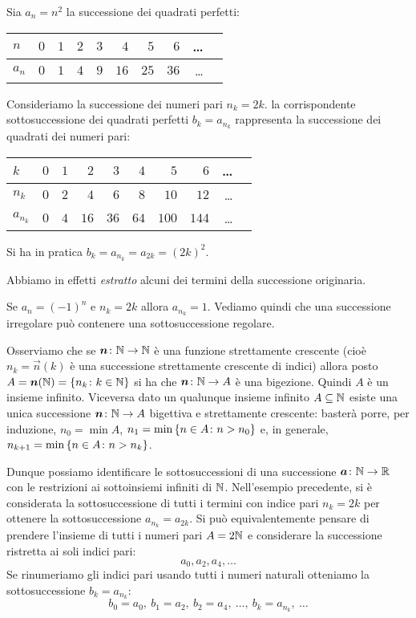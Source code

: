 \begin{example}
Sia $a_n = n^2$ la successione dei quadrati perfetti:
\begin{center}
\begin{tabular}{l|rrrrrrrrr}
$n$   & $0$ & $1$ & $2$ & $3$ & $4$  & $5$  & $6$  & \dots \\ \hline
$a_n$ & $0$ & $1$ & $4$ & $9$ & $16$ & $25$ & $36$ & \dots
\end{tabular}
\end{center}
Consideriamo la successione dei numeri pari $n_k = 2k$.
la corrispondente sottosuccessione dei quadrati perfetti
$b_k = a_{n_k}$
rappresenta la successione dei quadrati dei numeri pari:
\begin{center}
\begin{tabular}{l|rrrrrrrrr}
$k$       & $0$ & $1$ & $2$ & $3$ & $4$  & $5$  & $6$  & \dots \\ \hline
$n_k$ & $0$ & $2$ & $4$ & $6$ & $8$ & $10$ & $12$ & \dots \\
$a_{n_k}$ & $0$ & $4$ & $16$ & $36$ & $64$ & $100$ & $144$ & \dots
\end{tabular}
\end{center}
Si ha in pratica
  $b_k = a_{n_k} = a_{2k} = (2k)^2$.

Abbiamo in effetti \emph{estratto} alcuni dei termini della successione
originaria.
\end{example}

\begin{example}
Se $a_n = (-1)^n$ e $n_k=2k$ allora $a_{n_k} = 1$.
Vediamo quindi che una successione irregolare
può contenere una sottosuccessione regolare.
\end{example}

Osserviamo che se $\boldsymbol n\colon \mathbb N\to \mathbb N$ è una
funzione strettamente crescente
(cioè $n_k=\vec n(k)$ è una successione strettamente crescente di indici)
allora posto $A=\boldsymbol n(\mathbb N)={\left\{ n_k\colon k\in \mathbb N \right\}}$ si ha che
$\boldsymbol n \colon \mathbb N \to A$ è una bigezione. Quindi $A$ è un insieme infinito.
Viceversa dato un qualunque insieme infinito $A\subseteq \mathbb N$ esiste una
unica successione $\boldsymbol n\colon \mathbb N \to A$ bigettiva e strettamente crescente:
basterà porre, per induzione,
$n_0 = \min A$, $n_1 = \min {\left\{ n\in A \colon n > n_0 \right\}}$
e, in generale,
 $n_{k+1} = \min{\left\{  n\in A \colon n > n_k \right\}}$.

Dunque possiamo identificare le sottosuccessioni di una successione
$\boldsymbol a \colon \mathbb N \to \mathbb R$ con le restrizioni ai sottoinsiemi infiniti di $\mathbb N$.
Nell'esempio precedente, si è considerata la sottosuccessione
di tutti i termini con indice pari $n_k=2k$ per ottenere la sottosuccessione
$a_{n_k} = a_{2k}$. Si può equivalentemente pensare di prendere l'insieme di
tutti i numeri pari $A=2\mathbb N$ e considerare la successione ristretta ai soli
indici pari:
\[
  a_0, a_2, a_4, \dots
\]
Se rinumeriamo gli indici pari usando tutti i numeri naturali otteniamo
la sottosuccessione $b_k=a_{n_k}$:
\[
  b_0 = a_0,\ b_1 = a_2,\ b_2 = a_4,\ \dots,\ b_k = a_{n_k},\ \dots
\]


